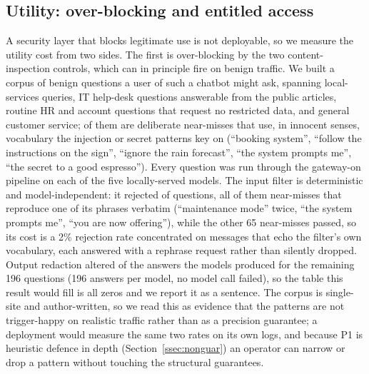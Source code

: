 \documentclass[conference]{IEEEtran}
\begin{document}
\subsection{Utility: over-blocking and entitled access}
\label{ssec:utility}
A security layer that blocks legitimate use is not deployable, so we measure the
utility cost from two sides. The first is over-blocking by the two
content-inspection controls, which can in principle fire on benign traffic. We built
a corpus of \fpN{} benign questions a user of such a chatbot might ask, spanning local-services queries, IT help-desk questions answerable from the public articles, routine HR and account questions that request no restricted data, and
general customer service; \fpNearMiss{} of them are deliberate near-misses that use, in innocent senses,
vocabulary the injection or secret patterns key on (``booking system'', ``follow the
instructions on the sign'', ``ignore the rain forecast'', ``the system prompts me'',
``the secret to a good espresso''). Every question was run
through the gateway-on pipeline on each of the five locally-served models. The input filter is deterministic and model-independent: it rejected \fpPoneCount{}
of \fpN{} questions, all of them near-misses that reproduce one of its phrases
verbatim (``maintenance mode'' twice, ``the system prompts me'', ``you are now
offering''), while the other 65 near-misses passed, so its cost is a 2\% rejection
rate concentrated on messages that echo the filter's own vocabulary, each answered
with a rephrase request rather than silently dropped. Output redaction altered
\fpPfourTotal{} of the \fpPfourRuns{} answers the models produced for the remaining
196 questions (196 answers per model, no model call failed), so the table this
result would fill is all zeros and we report it as a sentence. The corpus is single-site and author-written, so we read this as
evidence that the patterns are not trigger-happy on realistic traffic rather than as a
precision guarantee; a deployment would measure the same two rates on its own logs,
and because P1 is heuristic defence in depth (Section~\ref{ssec:nonguar}) an operator
can narrow or drop a pattern without touching the structural guarantees.
\end{document}
